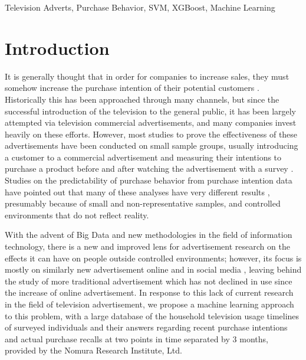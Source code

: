 \documentclass[review]{elsarticle}
\begin{document}
\begin{frontmatter}
\begin{abstract}
\end{abstract}

\begin{keyword}
Television Adverts\sep
Purchase Behavior\sep
SVM\sep
XGBoost\sep
Machine Learning
\end{keyword}

\end{frontmatter}

\linenumbers

\section{Introduction}
\label{intro}

It is generally thought that in order for companies to increase sales, they must somehow increase the purchase intention of their potential customers \cite{armstrong,morwitz}. Historically this has been approached through many channels, but since the successful introduction of the television to the general public, it has been largely attempted via television commercial advertisements, and many companies invest heavily on these efforts. However, most studies to prove the effectiveness of these advertisements have been conducted on small sample groups, usually introducing a customer to a commercial advertisement and measuring their intentions to purchase a product before and after watching the advertisement with a survey \cite[e.g.][]{khuong}. Studies on the predictability of purchase behavior from purchase intention data have pointed out that many of these analyses have very different results \cite{morwitz,sun,newberry}, presumably because of small and non-representative samples, and controlled environments that do not reflect reality. 

With the advent of Big Data and new methodologies in the field of information technology, there is a new and improved lens for advertisement research on the effects it can have on people outside controlled environments; however, its focus is mostly on similarly new advertisement online and in social media \cite{shareef-ma,gonzalez,ramaboa,wu}, leaving behind the study of more traditional advertisement which has not declined in use since the increase of online advertisement. In response to this lack of current research in the field of television advertisement, we propose a machine learning approach to this problem, with a large database of the household television usage timelines of surveyed individuals and their answers regarding recent purchase intentions and actual purchase recalls at two points in time separated by 3 months, provided by the Nomura Research Institute, Ltd. 
\end{document}
